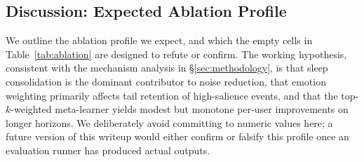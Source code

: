 \subsection{Discussion: Expected Ablation Profile}
\label{subsec:discussion}

We outline the ablation profile we expect, and which the empty cells in
Table~\ref{tab:ablation} are designed to refute or confirm. The working
hypothesis, consistent with the mechanism analysis in
\S\ref{sec:methodology}, is that sleep consolidation is the dominant
contributor to noise reduction, that emotion weighting primarily affects
tail retention of high-salience events, and that the top-$k$-weighted
meta-learner yields modest but monotone per-user improvements on
longer horizons. We deliberately avoid committing to numeric values here;
a future version of this writeup would either confirm or falsify this
profile once an evaluation runner has produced actual outputs.
